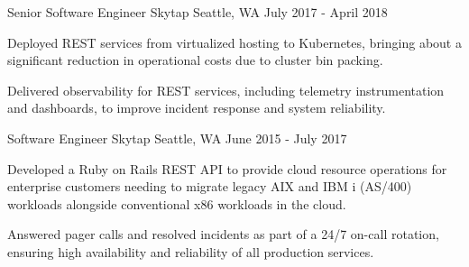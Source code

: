\begin{cventries}
  \cventry
    {Senior Software Engineer} %
    {Skytap} %
    {Seattle, WA} %
    {July 2017 - April 2018} %
    {
      \begin{cvitems} %
        \item {Deployed REST services from virtualized hosting to Kubernetes, bringing about a significant reduction in operational costs due to cluster bin packing.}
        \item {Delivered observability for REST services, including telemetry instrumentation and dashboards, to improve incident response and system reliability.}
      \end{cvitems}
    }

  \cventry
    {Software Engineer} %
    {Skytap} %
    {Seattle, WA} %
    {June 2015 - July 2017} %
    {
      \begin{cvitems} %
        \item {Developed a Ruby on Rails REST API to provide cloud resource operations for enterprise customers needing to migrate legacy AIX and IBM i (AS/400) workloads alongside conventional x86 workloads in the cloud.}
        \item {Answered pager calls and resolved incidents as part of a 24/7 on-call rotation, ensuring high availability and reliability of all production services.}
      \end{cvitems}
    }

\end{cventries}
